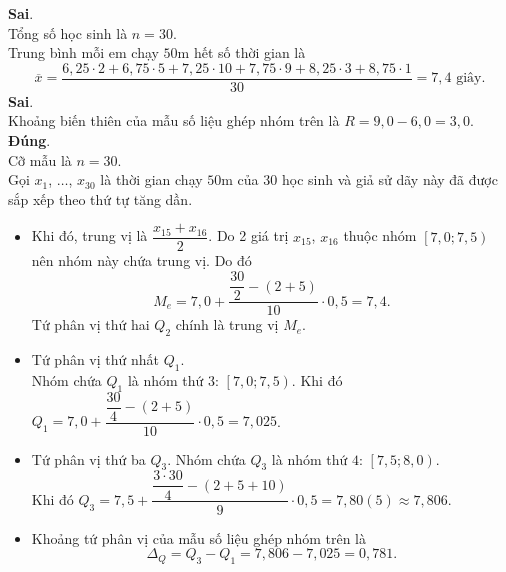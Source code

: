 \begin{ex}
{\begin{itemchoice}
		\itemch \textbf{Sai}.\\
		Tổng số học sinh là $n=30$.\\
		Trung bình mỗi em chạy $50$m hết số thời gian là
		\[\overline{x}
		=\dfrac{6{,}25\cdot 2+6{,}75\cdot 5+7{,}25\cdot 10+7{,}75\cdot 9+8{,}25\cdot 3+8{,}75\cdot 1}{30}
		=7{,}4\text{ giây}.\]
		\itemch \textbf{Sai}.\\
		Khoảng biến thiên của mẫu số liệu ghép nhóm trên là $R=9{,}0-6{,}0=3{,}0$.
		\itemch \textbf{Đúng}.\\
		Cỡ mẫu là $n=30$.\\
		Gọi $x_1$, $\ldots$, $x_{30}$ là thời gian chạy $50$m của $30$ học sinh và giả sử dãy này đã được sắp xếp theo thứ tự tăng dần.
		\begin{itemize}
			\item Khi đó, trung vị là $\dfrac{x_{15}+x_{16}}{2}$. Do 2 giá trị $x_{15}$, $x_{16}$ thuộc nhóm $\left[7{,}0;7{,}5 \right)$ nên nhóm này chứa trung vị. Do đó
			\[M_e=7{,}0+\dfrac{\dfrac{30}{2}-(2+5)}{10}\cdot 0{,}5=7{,}4.\]
			Tứ phân vị thứ hai $Q_2$ chính là trung vị $M_e$.
			\item Tứ phân vị thứ nhất $Q_1$.\\
			Nhóm chứa $Q_1$ là nhóm thứ $3$: $\left[ 7{,}0;7{,}5 \right)$. Khi đó $Q_1=7{,}0+\dfrac{\dfrac{30}{4}-\left(2+5 \right)}{10}\cdot 0{,}5=7{,}025$.
			\item Tứ phân vị thứ ba $Q_3$.
			Nhóm chứa $Q_3$ là nhóm thứ $4$: $\left[ 7{,}5;8{,}0 \right)$.\\
			Khi đó $Q_3=7{,}5+\dfrac{\dfrac{3\cdot 30}{4}-\left(2+5+10 \right)}{9}\cdot 0{,}5
			=7{,}80\left(5 \right)\approx 7{,}806$.
			\item Khoảng tứ phân vị của mẫu số liệu ghép nhóm trên là \[\Delta_Q=Q_3-Q_1=7{,}806-7{,}025=0{,}781.\]
		\end{itemize}
	\end{itemchoice}
}
\end{ex}

